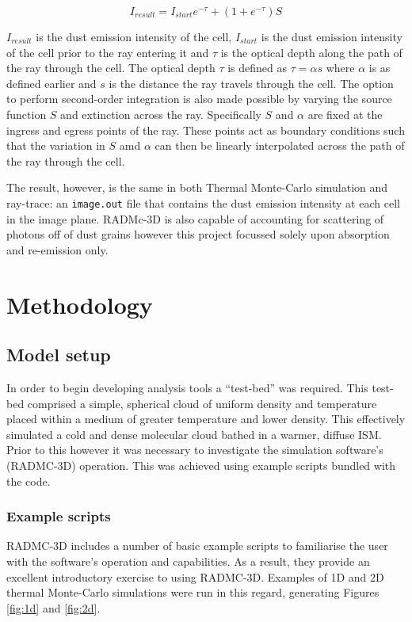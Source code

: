 \documentclass{report}
\begin{document}
\begin{equation}
  I_{result} = I_{start}e^{-\tau}+(1+e^{-\tau})S
\end{equation}\label{eq:raytrace}

$I_{result}$ is the dust emission intensity of the cell, $I_{start}$ is the dust emission intensity of the cell prior to the ray entering it and $\tau$ is the optical depth along the path of the ray through the cell. The optical depth $\tau$ is defined as $\tau = \alpha s$ where $\alpha$ is as defined earlier and $s$ is the distance the ray travels through the cell. The option to perform second-order integration is also made possible by varying the source function $S$ and extinction across the ray. Specifically $S$ and $\alpha$ are fixed at the ingress and egress points of the ray. These points act as boundary conditions such that the variation in $S$ amd $\alpha$ can then be linearly interpolated across the path of the ray through the cell.

The result, however, is the same in both Thermal Monte-Carlo simulation and ray-trace: an \texttt{image.out} file that contains the dust emission intensity at each cell in the image plane. RADMc-3D is also capable of accounting for scattering of photons off of dust grains however this project focussed solely upon absorption and re-emission only.


\chapter{Methodology}

\section{Model setup}
In order to begin developing analysis tools a ``test-bed'' was required. This test-bed comprised a simple, spherical cloud of uniform density and temperature placed within a medium of greater temperature and lower density. This effectively simulated a cold and dense molecular cloud bathed in a warmer, diffuse ISM. Prior to this however it was necessary to investigate the simulation software's (RADMC-3D) operation. This was achieved using example scripts bundled with the code.

\subsection{Example scripts}
RADMC-3D includes a number of basic example scripts to familiarise the user with the software's operation and capabilities. As a result, they provide an excellent introductory exercise to using RADMC-3D. Examples of 1D and 2D thermal Monte-Carlo simulations were run in this regard, generating Figures \ref{fig:1d} and \ref{fig:2d}.
\end{document}
